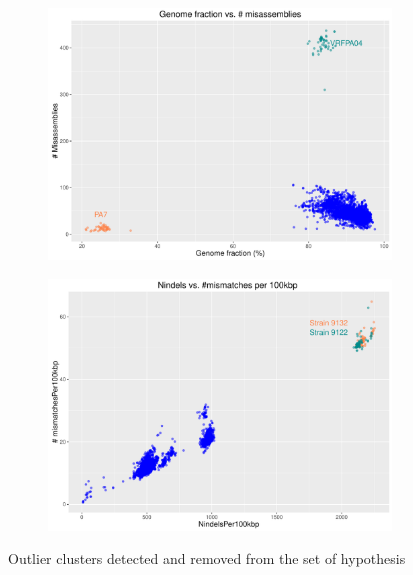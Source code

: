 \documentclass[11pt, a4paper,titlepage]{article}
\begin{document}
\begin{figure}[h]
  \begin{subfigure}{.5\textwidth}
    \centering
    \includegraphics[width=1\linewidth]{scatterplot_gfvsmis.pdf}
  \end{subfigure}%
  \begin{subfigure}{.5\textwidth}
    \centering
    \includegraphics[width=1\linewidth]{scatterplot_indels.pdf}
  \end{subfigure}
  \caption{Outlier clusters detected and removed from the set of
    hypothesis}
  \label{fig:outliers}
\end{figure}
\end{document}
